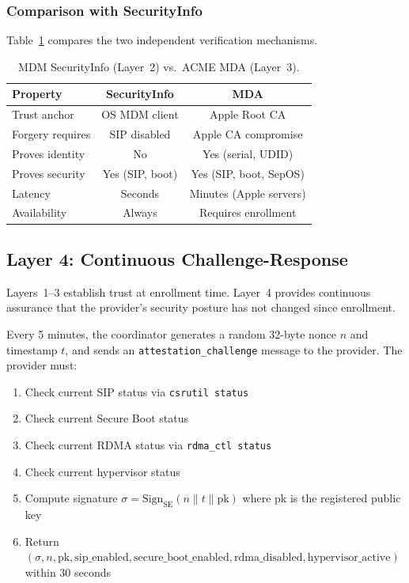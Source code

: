 \documentclass[10pt,twocolumn,letterpaper]{article}
\begin{document}
\subsubsection{Comparison with SecurityInfo}

Table~\ref{tab:secinfo-vs-mda} compares the two independent verification mechanisms.

\begin{table}[h]
\centering
\caption{MDM SecurityInfo (Layer~2) vs.\ ACME MDA (Layer~3).}
\vspace{4pt}
\small
\begin{tabular}{@{}lcc@{}}
\toprule
\textbf{Property} & \textbf{SecurityInfo} & \textbf{MDA} \\
\midrule
Trust anchor & OS MDM client & Apple Root CA \\
Forgery requires & SIP disabled & Apple CA compromise \\
Proves identity & No & Yes (serial, UDID) \\
Proves security & Yes (SIP, boot) & Yes (SIP, boot, SepOS) \\
Latency & Seconds & Minutes (Apple servers) \\
Availability & Always & Requires enrollment \\
\bottomrule
\end{tabular}
\label{tab:secinfo-vs-mda}
\end{table}

\subsection{Layer 4: Continuous Challenge-Response}
\label{sec:challenge}

Layers~1--3 establish trust at enrollment time. Layer~4 provides continuous assurance that the provider's security posture has not changed since enrollment.

Every 5 minutes, the coordinator generates a random 32-byte nonce $n$ and timestamp $t$, and sends an \texttt{attestation\_challenge} message to the provider. The provider must:

\begin{enumerate}[leftmargin=*,itemsep=1pt]
    \item Check current SIP status via \texttt{csrutil status}
    \item Check current Secure Boot status
    \item Check current RDMA status via \texttt{rdma\_ctl status}
    \item Check current hypervisor status
    \item Compute signature $\sigma = \text{Sign}_{\text{SE}}(n \| t \| \text{pk})$ where $\text{pk}$ is the registered public key
    \item Return $(\sigma, n, \text{pk}, \text{sip\_enabled}, \text{secure\_boot\_enabled}, \text{rdma\_disabled}, \text{hypervisor\_active})$ within 30 seconds
\end{enumerate}
\end{document}
